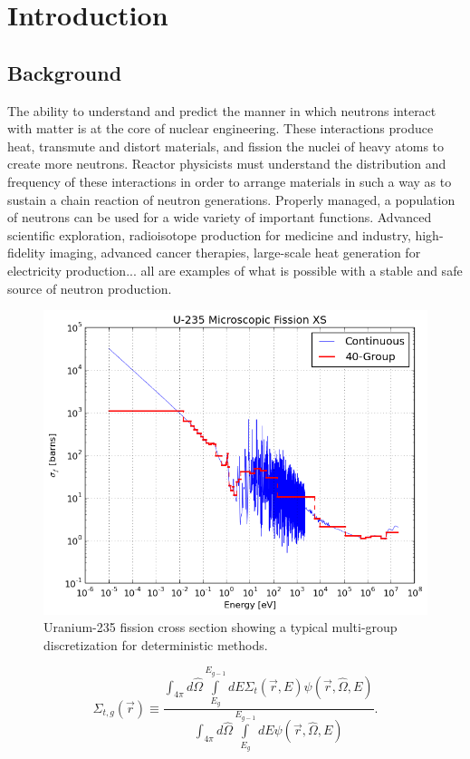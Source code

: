 \chapter{Introduction}
\label{chap:intro}

\section{Background}

The ability to understand and predict the manner in which neutrons interact with
matter is at the core of nuclear engineering. These interactions produce heat,
transmute and distort materials, and fission the nuclei of heavy atoms to
create more neutrons. Reactor physicists must understand the distribution and
frequency of these interactions in order to arrange materials in such a
way as to sustain a chain reaction of neutron generations. Properly managed, a
population of neutrons can be used for a wide variety of important functions.
Advanced scientific exploration, radioisotope production for medicine and
industry, high-fidelity imaging, advanced cancer therapies, large-scale heat
generation for electricity production... all are examples of what is possible
with a stable and safe source of neutron production.

\begin{figure}
  \centering
  \includegraphics[width=5in]{figures/u235-fission-40-group.png}
  \caption[Uranium-238 capture cross section]{Uranium-235 fission cross section
  showing a typical multi-group discretization for deterministic
  methods.\label{fig:multigroup}}
\end{figure}

\begin{equation}
  \Sigma_{t,g}(\vec{r}) \equiv \frac{\int_{4\pi}d\hat{\Omega}
  \int\limits_{E_g}^{E_{g-1}}dE {\Sigma_{t}(\vec{r},E)
  \psi(\vec{r},\hat{\Omega},E)}}{\int_{4\pi}d\hat{\Omega}
  \int\limits_{E_g}^{E_{g-1}}dE {\psi(\vec{r},\hat{\Omega},E)}}.
\end{equation}